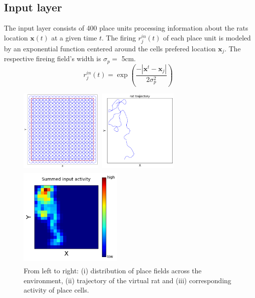 \documentclass[a4paper, 12pt]{article}
\begin{document}
\subsection{Input layer}
The input layer consists of 400 place units processing information about the rats location $\boldsymbol{x}(t)$ at a given time $t$. The firing $r_j^{in}(t)$ of each place unit is modeled by an exponential function centered around the cells prefered location $\boldsymbol{x}_j$. The respective fireing field's width is $\sigma_p=$ 5cm. 
	\begin{equation}
	r_j^{in}(t)=\exp\left(\frac{-|\boldsymbol{x}^t-\boldsymbol{x}_j|}{2\sigma_p^2}\right)
	\end{equation}
\begin{figure}[h]
\setlength{\abovecaptionskip}{5pt}
\setlength{\belowcaptionskip}{0pt}
\begin{minipage}[t]{0.3\textwidth}\vspace{0pt}
\includegraphics[width=4cm, height=4cm]{pics/place_cell_locations}
\end{minipage}\hfill%
\begin{minipage}[t]{0.3\textwidth}\vspace{0pt}
\includegraphics[width=4cm, height=4cm]{pics/mouse_demo}
\end{minipage}\hfill
\begin{minipage}[t]{0.3\textwidth}\vspace{0pt}
\includegraphics[width=5cm, height=5cm]{pics/activity_demo}
\end{minipage}
\caption{\footnotesize{From left to right: (i) distribution of place fields across the environment, (ii) trajectory of the virtual rat and (iii) corresponding activity of place cells.}}
\end{figure}
%
%
%	
\end{document}

